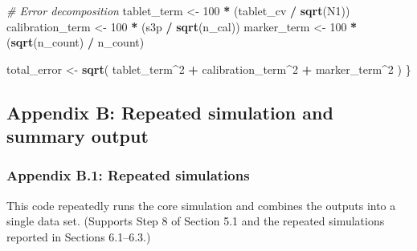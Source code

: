 \documentclass[
  12pt,
]{article}
\newenvironment{Shaded}{\begin{snugshade}}{\end{snugshade}}
\newcommand{\CommentTok}[1]{\textcolor[rgb]{0.56,0.35,0.01}{\textit{#1}}}
\newcommand{\DecValTok}[1]{\textcolor[rgb]{0.00,0.00,0.81}{#1}}
\newcommand{\FunctionTok}[1]{\textcolor[rgb]{0.13,0.29,0.53}{\textbf{#1}}}
\newcommand{\NormalTok}[1]{#1}
\newcommand{\OtherTok}[1]{\textcolor[rgb]{0.56,0.35,0.01}{#1}}
\newcommand{\SpecialCharTok}[1]{\textcolor[rgb]{0.81,0.36,0.00}{\textbf{#1}}}
\begin{document}
\begin{Shaded}
\begin{Highlighting}[]
    \CommentTok{\# Error decomposition}
\NormalTok{    tablet\_term }\OtherTok{\textless{}{-}} \DecValTok{100} \SpecialCharTok{*}\NormalTok{ (tablet\_cv }\SpecialCharTok{/} \FunctionTok{sqrt}\NormalTok{(N1))}
\NormalTok{    calibration\_term }\OtherTok{\textless{}{-}} \DecValTok{100} \SpecialCharTok{*}\NormalTok{ (s3p }\SpecialCharTok{/} \FunctionTok{sqrt}\NormalTok{(n\_cal))}
\NormalTok{    marker\_term }\OtherTok{\textless{}{-}} \DecValTok{100} \SpecialCharTok{*}\NormalTok{ (}\FunctionTok{sqrt}\NormalTok{(n\_count) }\SpecialCharTok{/}\NormalTok{ n\_count)}

\NormalTok{    total\_error }\OtherTok{\textless{}{-}} \FunctionTok{sqrt}\NormalTok{(}
\NormalTok{      tablet\_term}\SpecialCharTok{\^{}}\DecValTok{2} \SpecialCharTok{+}
\NormalTok{      calibration\_term}\SpecialCharTok{\^{}}\DecValTok{2} \SpecialCharTok{+}
\NormalTok{      marker\_term}\SpecialCharTok{\^{}}\DecValTok{2}
\NormalTok{    )}
\NormalTok{  \}}
\end{Highlighting}
\end{Shaded}

\subsection{Appendix B: Repeated simulation and summary
output}\label{appendix-b-repeated-simulation-and-summary-output}

\subsubsection{Appendix B.1: Repeated
simulations}\label{appendix-b.1-repeated-simulations}

This code repeatedly runs the core simulation and combines the outputs
into a single data set. (Supports Step 8 of Section 5.1 and the repeated
simulations reported in Sections 6.1--6.3.)
\end{document}
